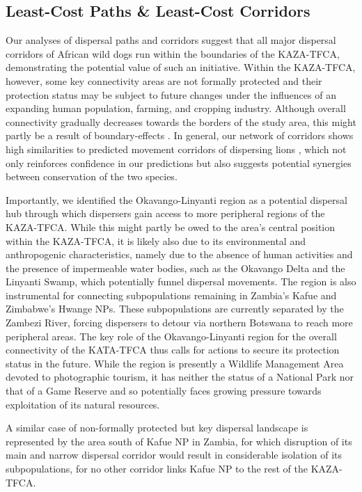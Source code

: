 \documentclass[abstract=on,10pt,a4paper,bibliography=totocnumbered]{scrartcl}
\begin{document}
\subsection{Least-Cost Paths \& Least-Cost Corridors}
Our analyses of dispersal paths and corridors suggest that all major dispersal
corridors of African wild dogs run within the boundaries of the KAZA-TFCA,
demonstrating the potential value of such an initiative. Within the KAZA-TFCA,
however, some key connectivity areas are not formally protected and their
protection status may be subject to future changes under the influences of an
expanding human population, farming, and cropping industry. Although overall
connectivity gradually decreases towards the borders of the study area, this
might partly be a result of boundary-effects \citep{Koen.2010}. In general, our
network of corridors shows high similarities to predicted movement corridors of
dispersing lions \citep{Elliot.2014}, which not only reinforces confidence in
our predictions but also suggests potential synergies between conservation of
the two species.

Importantly, we identified the Okavango-Linyanti region as a potential dispersal
hub through which dispersers gain access to more peripheral regions of the
KAZA-TFCA. While this might partly be owed to the area's central position within
the KAZA-TFCA, it is likely also due to its environmental and anthropogenic
characteristics, namely due to the absence of human activities and the presence
of impermeable water bodies, such as the Okavango Delta and the Linyanti Swamp,
which potentially funnel dispersal movements. The region is also instrumental
for connecting subpopulations remaining in Zambia’s Kafue and Zimbabwe’s Hwange
NPs. These subpopulations are currently separated by the Zambezi River, forcing
dispersers to detour via northern Botswana to reach more peripheral areas. The
key role of the Okavango-Linyanti region for the overall connectivity of the
KATA-TFCA thus calls for actions to secure its protection status in the future.
While the region is presently a Wildlife Management Area devoted to photographic
tourism, it has neither the status of a National Park nor that of a Game Reserve
and so potentially faces growing pressure towards exploitation of its natural
resources.

A similar case of non-formally protected but key dispersal landscape is
represented by the area south of Kafue NP in Zambia, for which disruption of its
main and narrow dispersal corridor would result in considerable isolation of its
subpopulations, for no other corridor links Kafue NP to the rest of the
KAZA-TFCA.
\end{document}
